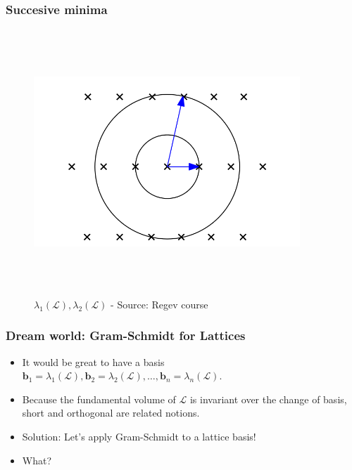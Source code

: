 \documentclass{beamer}
\begin{document}
\begin{frame}
    \frametitle{Succesive minima}
        \begin{figure}
            \includegraphics[width=10cm,height=10cm,keepaspectratio]{img/svp.png}
            \caption{$\lambda_1(\mathcal{L}), \lambda_2(\mathcal{L})$ - Source: Regev course}
        \end{figure}
\end{frame}
\begin{frame}
    \frametitle{Dream world: Gram-Schmidt for Lattices}
    \begin{itemize}
        \item It would be great to have a basis $\mathbf{b}_1 = \lambda_1(\mathcal{L}), \mathbf{b}_2 = \lambda_2(\mathcal{L}), \dots, \mathbf{b}_n = \lambda_n(\mathcal{L})$.
        \pause \item Because the fundamental volume of $\mathcal{L}$ is invariant over the change of basis, short and orthogonal are related notions.
        \pause \item Solution: Let's apply Gram-Schmidt to a lattice basis!
        \pause \item What?
    \end{itemize}
\end{frame}
\end{document}
